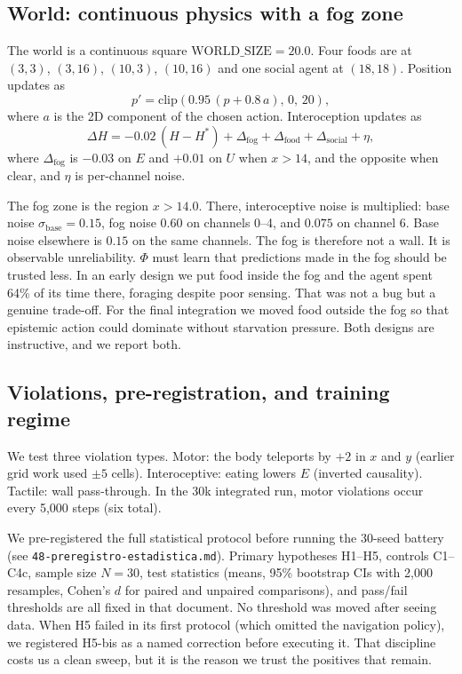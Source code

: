 \documentclass[11pt,a4paper]{article}
\begin{document}
\subsection{World: continuous physics with a fog zone}

The world is a continuous square $\mathrm{WORLD\_SIZE}=20.0$. Four foods are at $(3,3)$, $(3,16)$, $(10,3)$, $(10,16)$ and one social agent at $(18,18)$. Position updates as
\begin{equation}
p' = \mathrm{clip}(0.95 \,(p + 0.8\,a),\, 0,\, 20),
\end{equation}
where $a$ is the 2D component of the chosen action. Interoception updates as
\begin{equation}
\Delta H = -0.02\,(H-H^*) + \Delta_{\mathrm{fog}} + \Delta_{\mathrm{food}} + \Delta_{\mathrm{social}} + \eta,
\end{equation}
where $\Delta_{\mathrm{fog}}$ is $-0.03$ on $E$ and $+0.01$ on $U$ when $x>14$, and the opposite when clear, and $\eta$ is per-channel noise.

The fog zone is the region $x>14.0$. There, interoceptive noise is multiplied: base noise $\sigma_{\mathrm{base}}=0.15$, fog noise $0.60$ on channels 0--4, and $0.075$ on channel 6. Base noise elsewhere is $0.15$ on the same channels. The fog is therefore not a wall. It is observable unreliability. $\Phi$ must learn that predictions made in the fog should be trusted less. In an early design we put food inside the fog and the agent spent 64\% of its time there, foraging despite poor sensing. That was not a bug but a genuine trade-off. For the final integration we moved food outside the fog so that epistemic action could dominate without starvation pressure. Both designs are instructive, and we report both.

\subsection{Violations, pre-registration, and training regime}

We test three violation types. Motor: the body teleports by $+2$ in $x$ and $y$ (earlier grid work used $\pm5$ cells). Interoceptive: eating lowers $E$ (inverted causality). Tactile: wall pass-through. In the 30k integrated run, motor violations occur every 5,000 steps (six total).

We pre-registered the full statistical protocol before running the 30-seed battery (see \texttt{48-preregistro-estadistica.md}). Primary hypotheses H1--H5, controls C1--C4c, sample size $N=30$, test statistics (means, 95\% bootstrap CIs with 2,000 resamples, Cohen's $d$ for paired and unpaired comparisons), and pass/fail thresholds are all fixed in that document. No threshold was moved after seeing data. When H5 failed in its first protocol (which omitted the navigation policy), we registered H5-bis as a named correction before executing it. That discipline costs us a clean sweep, but it is the reason we trust the positives that remain.
\end{document}

